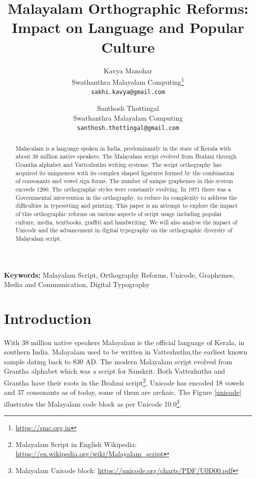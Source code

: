 \documentclass[10pt]{article}
\title{Malayalam Orthographic Reforms: \\Impact on Language and Popular Culture}
\author{Kavya Manohar \\
\small{Swathanthra Malayalam Computing\footnote{\url{https://smc.org.in}}} \\
 {\small {\tt sakhi.kavya@gmail.com}} \\
 \and
 Santhosh Thottingal \\
 \small{Swathanthra Malayalam Computing} \\
 {\small {\tt santhosh.thottingal@gmail.com}}}
\begin{document}
\maketitle

\begin{abstract}

Malayalam is a language spoken in India, predominantly in the state of Kerala with about 38 million native speakers. The Malayalam script evolved from Brahmi through Grantha alphabet and Vattezhuthu writing systems. The script orthography has acquired its uniqueness with its complex shaped ligatures formed by the combination of consonants and vowel sign forms. The number of unique graphemes in this system exceeds 1200. The orthographic styles were constantly evolving. In 1971 there was a Governmental intervention in the orthography, to reduce its complexity to address the difficulties in typesetting and printing. This paper is an attempt to explore the impact of this orthographic reforms on various aspects of script usage including popular culture, media, textbooks, graffiti and handwriting. We will also analyse the impact of Unicode and the advancement in digital typography on the orthographic diversity of Malayalam script.

\end{abstract}
 \textbf{Keywords:} Malayalam Script, Orthography Reforms, Unicode, Graphemes, Media and Communication, Digital Typography

\section{Introduction}

\paragraph{}
With 38 million native speakers Malayalam is the official language of Kerala, in southern India. Malayalam used to be written in Vattezhuthu,the earliest known sample dating back to 830 AD. The modern Malayalam script evolved from Grantha alphabet which was a script for Sanskrit. Both Vattezhuthu and Grantha have their roots in the Brahmi script\footnote{Malayalam Script in English Wikipedia: \url{https://en.wikipedia.org/wiki/Malayalam_script}}. Unicode has encoded 18 vowels and 37 consonants as of today, some of them are archaic.  The Figure \ref{unicode} illustrates the Malayalam code block as per Unicode 10.0\footnote{Malayalam Unicode block: \url{https://unicode.org/charts/PDF/U0D00.pdf}}. 
\end{document}
